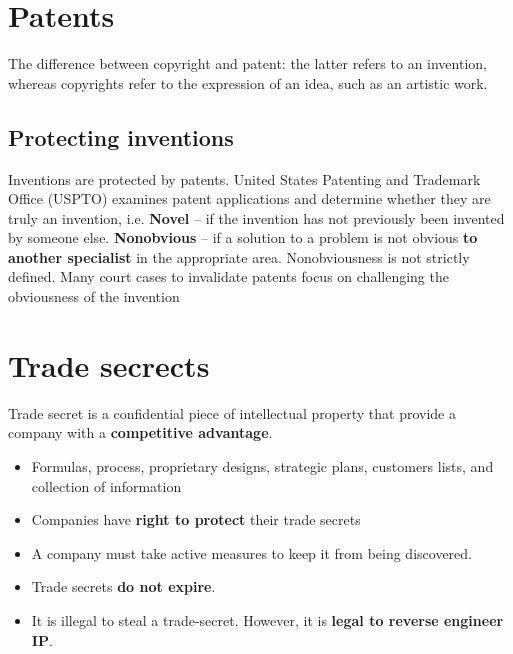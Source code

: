 \documentclass{article}
\begin{document}
\section{Patents}
\begin{flushleft}
The difference between copyright and patent: the latter refers to an invention, whereas copyrights refer to the expression of an idea, such as an artistic work. 
\end{flushleft}

\subsection{Protecting inventions}
\begin{flushleft}
Inventions are protected by patents. United States Patenting and Trademark Office (USPTO) examines patent applications and determine whether they are truly an invention, i.e. \textbf{Novel} – if the invention has not previously been invented by someone else. \textbf{Nonobvious} – if a solution to a problem is not obvious \textbf{to another specialist} in the appropriate area. Nonobviousness is not strictly defined. Many court cases to invalidate patents focus on challenging the obviousness of the invention
\end{flushleft}

\section{Trade secrects}
\begin{flushleft}
Trade secret is a confidential piece of intellectual property that provide a company with a \textbf{competitive advantage}.
\begin{itemize}
  \item Formulas, process, proprietary designs, strategic plans, customers lists, and collection of information
  \item Companies have \textbf{right to protect} their trade secrets 
  \item A company must take active measures to keep it from being discovered. 
  \item Trade secrets \textbf{do not expire}. 
  \item It is illegal to steal a trade-secret. However, it is \textbf{legal to reverse engineer IP}.
\end{itemize}
\end{flushleft}
\end{document}
